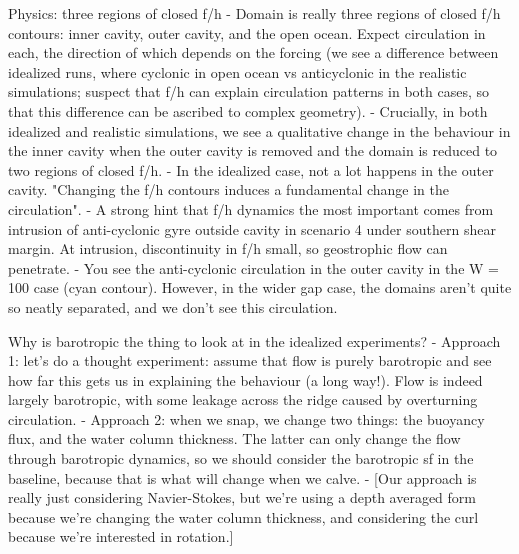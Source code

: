 Physics: three regions of closed f/h
    - Domain is really three regions of closed f/h contours: inner cavity, outer cavity, and the open ocean. Expect circulation in each, the direction of which depends on the forcing (we see a difference between idealized runs, where cyclonic in open ocean vs anticyclonic in the realistic simulations; suspect that f/h can explain circulation patterns in both cases, so that this difference can be ascribed to complex geometry).
    - Crucially, in both idealized and realistic simulations, we see a qualitative change in the behaviour in the inner cavity when the outer cavity is removed and the domain is reduced to two regions of closed f/h. 
    - In the idealized case, not a lot happens in the outer cavity. "Changing the f/h contours induces a fundamental change in the circulation".
    - A strong hint that f/h dynamics the most important comes from intrusion of anti-cyclonic gyre outside cavity in scenario 4 under southern shear margin. At intrusion, discontinuity in f/h small, so geostrophic flow can penetrate.
    - You see the anti-cyclonic circulation in the outer cavity in the W = 100 case (cyan contour). However, in the wider gap case, the domains aren't quite so neatly separated, and we don't see this circulation.
    
Why is barotropic the thing to look at in the idealized experiments?
    - Approach 1: let's do a thought experiment: assume that flow is purely barotropic and see how far this gets us in explaining the behaviour (a long way!). Flow is indeed largely barotropic, with some leakage across the ridge caused by overturning circulation.
    - Approach 2: when we snap, we change two things: the buoyancy flux, and the water column thickness. The latter can only change the flow through barotropic dynamics, so we should consider the barotropic sf in the baseline, because that is what will change when we calve. 
    - [Our approach is really just considering Navier-Stokes, but we're using a depth averaged form because we're changing the water column thickness, and considering the curl because we're interested in rotation.]

    
